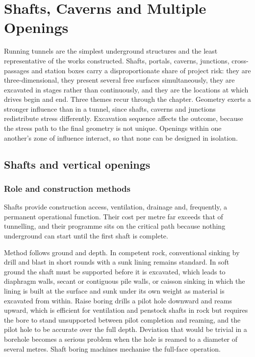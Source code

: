 \chapter{Shafts, Caverns and Multiple Openings}
\label{ch:openings}

Running tunnels are the simplest underground structures and the least
representative of the works constructed. Shafts, portals, caverns,
junctions, cross-passages and station boxes carry a disproportionate share of
project risk: they are three-dimensional, they present several free surfaces
simultaneously, they are excavated in stages rather than continuously, and
they are the locations at which drives begin and end. Three themes recur
through the chapter. Geometry exerts a stronger influence than in a tunnel,
since shafts, caverns and junctions redistribute stress differently.
Excavation sequence affects the outcome, because the stress path to the final
geometry is not unique. Openings within one another's zone of influence
interact, so that none can be designed in isolation.

\section{Shafts and vertical openings}
\label{sec:shafts}

\subsection{Role and construction methods}
\label{sec:shaft-role-methods}

Shafts provide construction access, ventilation, drainage and, frequently, a
permanent operational function. Their cost per metre far exceeds that of
tunnelling, and their programme sits on the critical path because nothing
underground can start until the first shaft is complete.

Method follows ground and depth. In competent rock, conventional sinking by
drill and blast in short rounds with a sunk lining remains standard. In soft
ground the shaft must be supported before it is excavated, which leads to
diaphragm walls, secant or contiguous pile walls, or caisson sinking in which
the lining is built at the surface and sunk under its own weight as material is
excavated from within. Raise boring drills a pilot hole downward and reams
upward, which is efficient for ventilation and penstock shafts in rock but
requires the bore to stand unsupported between pilot completion and reaming,
and the pilot hole to be accurate over the full depth. Deviation that would
be trivial in a borehole becomes a serious problem when the hole is reamed to
a diameter of several metres. Shaft boring machines mechanise the full-face
operation.

